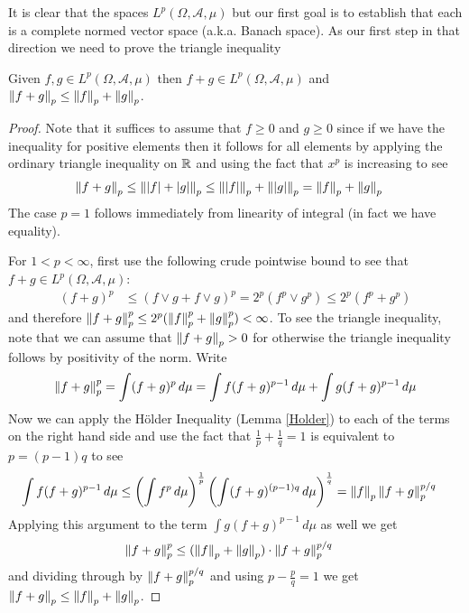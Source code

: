 It is clear that the spaces $L^p(\Omega, \mathcal{A}, \mu)$ but our first goal is to establish that each is a complete
normed vector space (a.k.a. Banach space).  As our first step in that
direction we need to prove the triangle inequality
\begin{lem}\label{MinkowskiInequality}Given $f,g
  \in L^p(\Omega,  \mathcal{A}, \mu)$ then $f+g \in L^p(\Omega,
  \mathcal{A}, \mu)$ and $\left \lVert f+g \right \rVert_p \leq \left \lVert f \right \rVert_p + \left \lVert g \right \rVert_p$.
\end{lem}
\begin{proof}
Note that it suffices to assume that $f \geq 0$ and $g \geq 0$ since
if we have the inequality for positive elements then it follows for
all elements by applying the ordinary triangle inequality on $\mathbb{R}$
and using the fact that $x^p$ is increasing to see
\begin{align*}
\left \lVert f+g \right \rVert_p &\leq \left \lVert \left \vert f \right \vert+\left \vert g \right \vert \right \rVert_p \leq
\left \lVert \left \vert f \right \vert \right \rVert_p+\left \lVert \left \vert g \right \vert \right \rVert_p = \left \lVert f \right \rVert_p+\left \lVert g \right \rVert_p 
\end{align*}
The case $p=1$ follows immediately from linearity of integral (in fact
we have equality).  

For $1 < p < \infty$, first use the following
crude pointwise bound to see that $f+g \in L^p(\Omega,  \mathcal{A}, \mu)$:
\begin{align*}
(f+g)^p &\leq (f \vee g + f \vee g)^p = 2^p (f^p \vee g^p)\leq 2^p (f^p
+ g^p)
\end{align*}
and therefore $\left \lVert f+g \right \rVert_p^p \leq 2^p (\left \lVert f \right \rVert_p^p + \left \lVert g \right \rVert_p^p) <
\infty$.  To see the triangle inequality, note that we can assume that
$\left \lVert f+g \right \rVert_p > 0$ for otherwise the triangle inequality follows by
positivity of the norm.  Write
\begin{align*}
\left \lVert f+g \right \rVert_p^p &= \int (f+g)^p \, d\mu = \int f (f+g)^{p-1} \, d\mu +
\int g (f+g)^{p-1} \, d\mu \\
\end{align*}
Now we can apply the H\"{o}lder Inequality (Lemma
\ref{Holder}) to each of the terms on the right hand side and use the
fact that $\frac{1}{p} + \frac{1}{q}=1$ is equivalent to $p = (p-1)q$ to see
\begin{align*}
\int f (f+g)^{p-1} \, d\mu &\leq \left(\int f^p \,
  d\mu\right)^\frac{1}{p}\left(\int (f+g)^{(p-1)q} \,
  d\mu\right)^\frac{1}{q} =\left \lVert f \right \rVert_p \left \lVert f+g \right \rVert_p^{p/q}
\end{align*}
Applying this argument to the term $\int g (f+g)^{p-1} \, d\mu$ as
well we get
\begin{align*}
\left \lVert f+g \right \rVert_p^p &\leq  (\left \lVert f \right \rVert_p + \left \lVert g \right \rVert_p) \cdot
\left \lVert f+g \right \rVert_p^{p/q}
\end{align*}
and dividing through by $\left \lVert f+g \right \rVert_p^{p/q}$ and using $p - \frac{p}{q}=1$ we get $\left \lVert f+g \right \rVert_p \leq  \left \lVert f \right \rVert_p + \left \lVert g \right \rVert_p$.
\end{proof}

